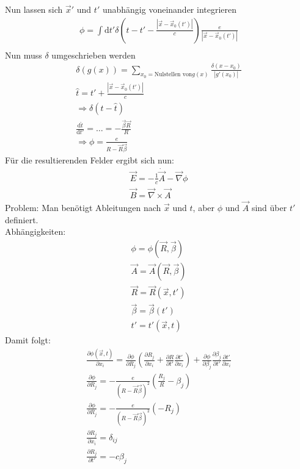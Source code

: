 \documentclass[a4paper]{article}
\begin{document}
Nun lassen sich $\vec{x}'$ und $t'$ unabhängig voneinander integrieren
\begin{align}
\phi=\int \mathrm{d}t' \delta\left(t-t'-\frac{|\vec{x}-\vec{x}_0(t')|}{c}\right)
\frac{e}{|\vec{x}-\vec{x}_0(t')|}\\
\end{align}
Nun muss $\delta$ umgeschrieben werden
\begin{align}
\delta(g(x))=\sum_{x_0=\text{Nulstellen von
}g(x)}\frac{\delta(x-x_0)}{|g'(x_0)|}\\
\hat{t}=t'+\frac{|\vec{x}-\vec{x}_0(t')|}{c}\\
\Rightarrow \delta(t-\hat{t})\\
\frac{\mathrm{d}\hat{t}}{\mathrm{d}t'}=\ldots=-\frac{\vec{\beta}\vec{R}}{R}\\
\Rightarrow \phi=\frac{e}{R-\vec{R}\vec{\beta}}
\end{align}
Für die resultierenden Felder ergibt sich nun:
\begin{align}
\vec{E}=-\frac{1}{c}\dot{\vec{A}}-\vec{\nabla}\phi\\
\vec{B}=\vec{\nabla}\times\vec{A}
\end{align}
Problem: Man benötigt Ableitungen nach $\vec{x}$ und $t$, aber $\phi$ und
$\vec{A}$ sind über $t'$ definiert.\\
Abhängigkeiten:
\begin{align}
\phi=\phi(\vec{R},\vec{\beta})\\
\vec{A}=\vec{A}(\vec{R},\vec{\beta})\\
\vec{R}=\vec{R}(\vec{x},t')\\
\vec{\beta}=\vec{\beta}(t')\\
t'=t'(\vec{x},t)
\end{align}
Damit folgt:
\begin{align}
\frac{\partial \phi(\vec{x},t)}{\partial x_i}=\frac{\partial \phi}{\partial
R_j}\left( \frac{\partial R_j}{\partial x_i} +\frac{\partial R}{\partial
t'} \frac{\partial t'}{\partial x_i}\right)+\frac{\partial \phi}{\partial
\beta_j}\frac{\partial \beta_j}{\partial t'}\frac{\partial t'}{\partial x_i}\\
\frac{\partial \phi}{\partial
R_j}=-\frac{e}{(R-\vec{R}\vec{\beta})^2}(\frac{R_j}{R}-\beta_j)\\
\frac{\partial \phi}{\partial
R_j}=-\frac{e}{(R-\vec{R}\vec{\beta})^2}(-R_j)\\
\frac{\partial R_j}{\partial x_i}=\delta_{ij}\\
\frac{\partial R_j}{\partial t'}=-c\beta_j\\
\end{align}
\end{document}
